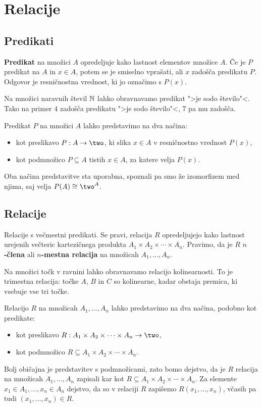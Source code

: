 \chapter{Relacije}

\section{Predikati}

\textbf{Predikat} na množici $A$ opredeljuje kako lastnost elementov množice $A$. Če
je $P$ predikat na $A$ in $x \in A$, potem se je smiselno vprašati, ali $x$
zadošča predikatu $P$. Odgovor je resničnostna vrednost, ki jo označimo s $P(x)$.

\begin{primer}
  Na množici naravnih števil $\mathbb{N}$ lahko obravnavamo predikat ">je sodo
  število"<. Tako na primer $4$ zadošča predikatu ">je sodo število"<, $7$ pa mu zadošča.
\end{primer}

Predikat $P$ na množici $A$ lahko predstavimo na dva načina:
%
\begin{itemize}
\item kot preslikavo $P : A \to \two$, ki slika $x \in A$ v resničnostno vrednost $P(x)$,
\item kot podmnožico $P \subseteq A$ tistih $x \in A$, za katere velja $P(x)$.
\end{itemize}
%
Oba načina predstavitve sta uporabna, spoznali pa smo že izomorfizem med njima,
saj velja $P(A) \iso \two^A$.

\section{Relacije}

Relacije s večmestni predikati. Se pravi, relacija $R$ opredeljujejo kako
lastnost urejenih večteric kartezičnega produkta $A_1 \times A_2 \times \cdots \times A_n$. Pravimo, da je $R$ \textbf{$n$-člena} ali \textbf{$n$-mestna relacija} na množicah $A_1, …, A_n$.

\begin{primer}
  Na množici točk v ravnini lahko obravnavamo relacijo kolinearnosti.
  To je trimestna relacija: točke $A$, $B$ in $C$ so kolinearne, kadar obstaja
  premica, ki vsebuje vse tri točke.
\end{primer}

Relacijo $R$ na množicah $A_1, \ldots, A_n$ lahko predstavimo na dva načina, podobno
kot predikate:
\begin{itemize}
\item kot preslikavo $R : A_1 \times A_2 \times \cdots \times A_n \to \two$,
\item kot podmnožico $R \subseteq A_1 \times A_2 \times \cdots \times A_n$.
\end{itemize}
%
Bolj običajna je predstavitev s podmnožicami, zato bomo dejstvo, da je $R$
relacija na množicah $A_1, \ldots, A_n$ zapisali kar kot $R \subseteq A_1 \times A_2 \times \cdots \times A_n$.
Za elemente $x_1 \in A_1, \ldots, x_n \in A_n$ dejstvo, da so v relaciji $R$ zapišemo
$R(x_1, \ldots, x_n)$, včasih pa tudi $(x_1, \ldots, x_n) \in R$.

